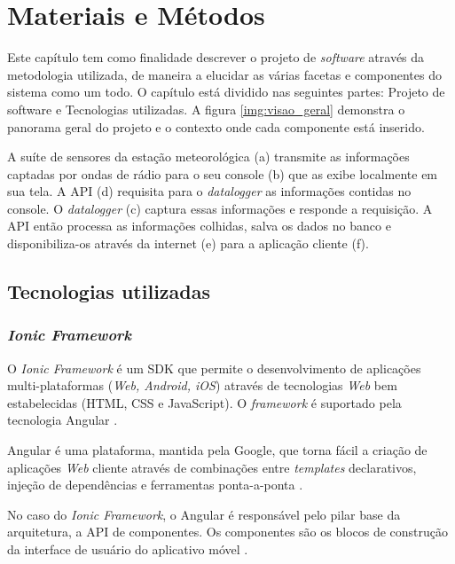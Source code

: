 \chapter{Materiais e Métodos} \label{ch:MM}

Este capítulo tem como finalidade descrever o projeto de \textit{software} através da metodologia utilizada, de maneira a elucidar as várias facetas e componentes do sistema como um todo. O capítulo está dividido nas seguintes partes: Projeto de software e Tecnologias utilizadas. A figura \ref{img:visao_geral}  demonstra o panorama geral do projeto e o contexto onde cada componente está inserido.


A suíte de sensores da estação meteorológica (a) transmite as informações captadas por ondas de rádio para o seu console (b) que as exibe localmente em sua tela. A API (d) requisita para o \textit{datalogger} as informações contidas no console. O \textit{datalogger} (c) captura essas informações e responde a requisição. A API então processa as informações colhidas, salva os dados no banco e disponibiliza-os através da internet (e) para a aplicação cliente (f).



\section{Tecnologias  utilizadas}

\subsection{\textit{Ionic Framework}} \label{subsec:Ionic}

O \textit{Ionic Framework} é um SDK que permite o desenvolvimento de aplicações multi-plataformas (\textit{Web, Android, iOS}) através de tecnologias \textit{Web} bem estabelecidas (HTML, CSS e JavaScript). O \textit{framework} é suportado pela tecnologia Angular \cite{SITEIONIC}.

Angular é uma plataforma, mantida pela Google, que torna fácil a criação de aplicações \textit{Web} cliente através de combinações entre \textit{templates} declarativos, injeção de dependências e ferramentas ponta-a-ponta \cite{SITEANGULAR}.

No caso do \textit{Ionic Framework}, o Angular é responsável pelo pilar base da arquitetura, a API de componentes. Os componentes são os blocos de construção da interface de usuário do aplicativo móvel \cite{SITEIONIC}.

